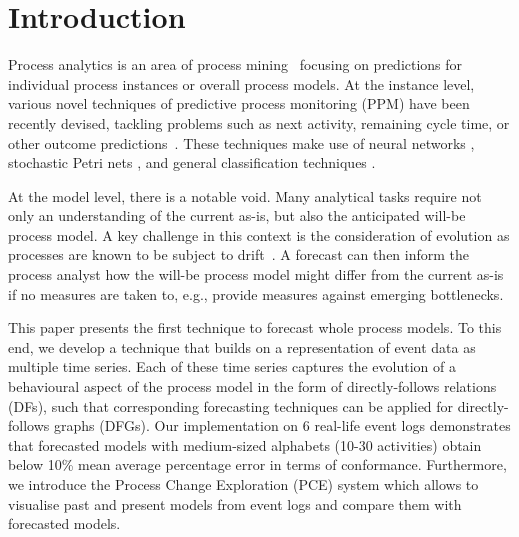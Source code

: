 \section{Introduction}\label{sec:introduction}
Process analytics is an area of process mining~\cite{van2016data} focusing on predictions for individual process instances or overall process models. At the instance level, 
various novel techniques of predictive process monitoring (PPM)  have been recently devised, tackling problems such as next activity, remaining cycle time, or other outcome predictions~\cite{DBLP:conf/bpm/Francescomarino18}. These techniques make use of neural networks \cite{DBLP:conf/caise/TaxVRD17}, stochastic Petri nets \cite{DBLP:conf/icsoc/Rogge-SoltiW13}, and general classification techniques \cite{DBLP:journals/tkdd/TeinemaaDRM19}.

At the model level, there is a notable void. Many analytical tasks require not only an understanding of the current as-is, but also the anticipated will-be process model. A key challenge in this context is the consideration of evolution as processes are known to be subject to drift~\cite{DBLP:conf/bpm/PollPRRR18,yeshchenko2021visual}. A forecast can then inform the process analyst how the will-be process model might differ from the current as-is if no measures are taken to, e.g., provide measures against emerging bottlenecks.

This paper presents the first technique to forecast whole process models. To this end, we develop a technique that builds on a representation of event data as multiple time series. Each of these time series captures the evolution of a behavioural aspect of the process model in the form of directly-follows relations (DFs), such that corresponding forecasting techniques can be applied for directly-follows graphs (DFGs). Our implementation on 6 real-life event logs demonstrates that forecasted models with medium-sized alphabets (10-30 activities) obtain below 10\% mean average percentage error in terms of conformance.
Furthermore, we introduce the Process Change Exploration (PCE) system which allows to visualise past and present models from event logs and compare them with forecasted models.


